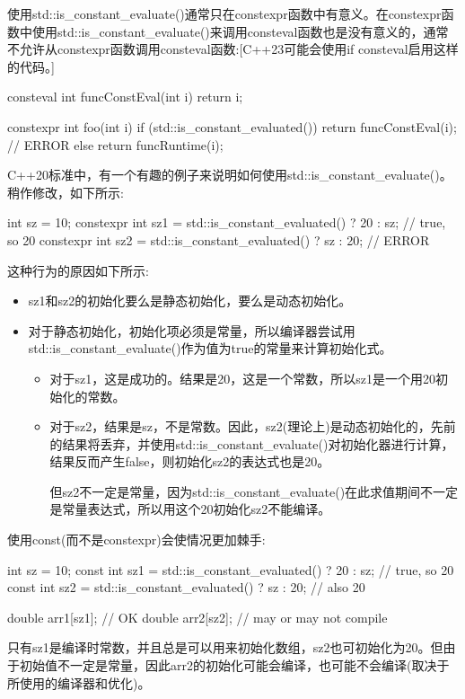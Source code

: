 使用std::is\_constant\_evaluate()通常只在constexpr函数中有意义。在constexpr函数中使用std::is\_constant\_evaluate()来调用consteval函数也是没有意义的，通常不允许从constexpr函数调用consteval函数:[C++23可能会使用if consteval启用这样的代码。]

\begin{cpp}
consteval int funcConstEval(int i) {
	return i;
}

constexpr int foo(int i) {
	if (std::is_constant_evaluated()) {
		return funcConstEval(i); // ERROR
	}
	else {
		return funcRuntime(i);
	}
}
\end{cpp}


C++20标准中，有一个有趣的例子来说明如何使用std::is\_constant\_evaluate()。稍作修改，如下所示:

\begin{cpp}
int sz = 10;
constexpr int sz1 = std::is_constant_evaluated() ? 20 : sz; // true, so 20
constexpr int sz2 = std::is_constant_evaluated() ? sz : 20; // ERROR
\end{cpp}

这种行为的原因如下所示:

\begin{itemize}
\item
sz1和sz2的初始化要么是静态初始化，要么是动态初始化。

\item
对于静态初始化，初始化项必须是常量，所以编译器尝试用std::is\_constant\_evaluate()作为值为true的常量来计算初始化式。

\begin{itemize}
\item
对于sz1，这是成功的。结果是20，这是一个常数，所以sz1是一个用20初始化的常数。

\item
对于sz2，结果是sz，不是常数。因此，sz2(理论上)是动态初始化的，先前的结果将丢弃，并使用std::is\_constant\_evaluate()对初始化器进行计算，结果反而产生false，则初始化sz2的表达式也是20。

但sz2不一定是常量，因为std::is\_constant\_evaluate()在此求值期间不一定是常量表达式，所以用这个20初始化sz2不能编译。
\end{itemize}
\end{itemize}

使用const(而不是constexpr)会使情况更加棘手:

\begin{cpp}
int sz = 10;
const int sz1 = std::is_constant_evaluated() ? 20 : sz; // true, so 20
const int sz2 = std::is_constant_evaluated() ? sz : 20; // also 20

double arr1[sz1]; // OK
double arr2[sz2]; // may or may not compile
\end{cpp}

只有sz1是编译时常数，并且总是可以用来初始化数组，sz2也可初始化为20。但由于初始值不一定是常量，因此arr2的初始化可能会编译，也可能不会编译(取决于所使用的编译器和优化)。


















